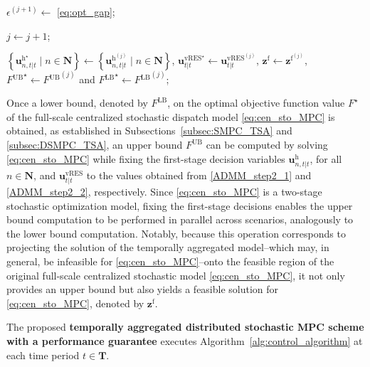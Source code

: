 \documentclass[a4paper,fleqn]{cas-sc}
\begin{document}
\begin{algorithm}[t]
\begin{algorithmic}[1]
\State  $\epsilon^{(j+1)} \gets$ \eqref{eq:opt_gap};

\State $j \gets j+1$;

\EndWhile

\vspace{0.1cm}
\State $\left\{\boldsymbol{u}^{\boldsymbol{\mathrm{h}}^{\star}}_{n,t|t} \;\Big|\; n \in \boldsymbol{N}\right\}
\gets
\left\{\boldsymbol{u}^{\boldsymbol{\mathrm{h}}^{(j)}}_{n,t|t} \;\Big|\; n \in \boldsymbol{N}\right\}$,
$\boldsymbol{u}^{\boldsymbol{\mathrm{vRES}}^{\star}}_{t|t}
\gets
\boldsymbol{u}^{\boldsymbol{\mathrm{vRES}}^{(j)}}_{t|t}$,
$\boldsymbol{z^\mathrm{f}} \gets \boldsymbol{z}^{{\boldsymbol{\mathrm{f}}}^{(j)}}$, $F{{^\mathrm{UB}}^\star} \gets F{{^\mathrm{UB}}^{(j)}}$ and $F{{^\mathrm{LB}}^\star} \gets F{{^\mathrm{LB}}^{(j)}}$;

\end{algorithmic}
\end{algorithm}

Once a lower bound, denoted by $F^{\mathrm{LB}}$, on the optimal objective function value $F^\star$ of the full-scale centralized stochastic dispatch model \eqref{eq:cen_sto_MPC} is obtained,
as established in Subsections~\ref{subsec:SMPC_TSA} and \ref{subsec:DSMPC_TSA}, 
an upper bound $F^{\mathrm{UB}}$ can be computed by solving \eqref{eq:cen_sto_MPC} while fixing the first-stage decision variables
$\boldsymbol{u}^{\mathrm{h}}_{n,t|t}$, for all $n \in \boldsymbol{N}$,
and $\boldsymbol{u}^{\mathrm{vRES}}_{t|t}$
to the values obtained from \eqref{ADMM_step2_1} and \eqref{ADMM_step2_2}, respectively.
Since \eqref{eq:cen_sto_MPC} is a two-stage stochastic optimization model,
fixing the first-stage decisions enables the upper bound computation to be performed in parallel across scenarios, analogously to the lower bound computation.
Notably, because this operation corresponds to projecting the solution of the temporally aggregated model--which may, in general, be infeasible for \eqref{eq:cen_sto_MPC}--onto the feasible region of the original full-scale centralized stochastic model \eqref{eq:cen_sto_MPC},
it not only provides an upper bound but also yields a feasible solution for \eqref{eq:cen_sto_MPC}, denoted by $\boldsymbol{z^\mathrm{f}}$.

The proposed \textbf{temporally aggregated distributed stochastic MPC scheme with a performance guarantee} executes Algorithm~\ref{alg:control_algorithm} at each time period $t \in \boldsymbol{T}$.
\end{document}
